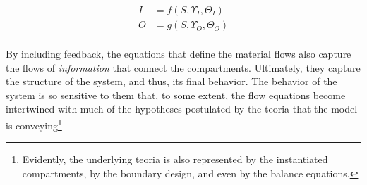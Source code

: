 \documentclass[./main_en.tex]{subfiles}
\begin{document}
\begin{linenomath*}
\begin{equation}
\label{eq:flows}
\begin{split}
    I &= f(S, \Upsilon_{I}, \Theta_{I})\\
    O &= g(S, \Upsilon_{O}, \Theta_{O})\\
\end{split}
\end{equation}
\end{linenomath*}
By including \gls{feedback}, the equations that define the material flows also capture the flows of \textit{information} that connect the compartments. Ultimately, they capture the structure of the \gls{system}, and thus, its final behavior. The behavior of the \gls{system} is so sensitive to them that, to some extent, the flow equations become intertwined with much of the hypotheses postulated by the \gls{teoria} that the \gls{model} is conveying\footnote{Evidently, the underlying \gls{teoria} is also represented by the instantiated compartments, by the boundary design, and even by the balance equations.}
\end{document}
